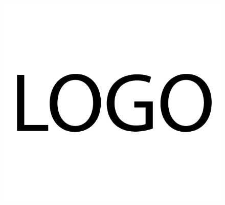 \documentclass[a4paper,10pt]{article}
\begin{document}
\begin{figure}[!h]
\begin{flushleft}
\includegraphics[scale=0.2]{facture-banlieues-logo.png}
\end{flushleft}
\end{figure}





\rsfbMonnaieTableauProduits{\euro}
\end{document}
